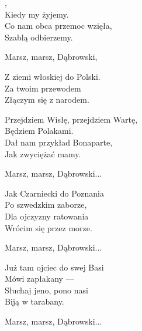 \documentclass[12pt,a4paper,twoside]{songbook}
\begin{document}
  \begin{lyrics}
    ,\\
    Kiedy my żyjemy.\\
    Co nam obca przemoc wzięła,\\
    Szablą odbierzemy.

    
    Marsz, marsz, Dąbrowski,\\
    \begin{bis}%
      Z ziemi włoskiej do Polski.\\
      Za twoim przewodem\\
      Złączym się z narodem.%
    \end{bis}
    
    Przejdziem Wisłę, przejdziem Wartę,\\
    Będziem Polakami.\\
    Dał nam przykład Bonaparte,\\
    Jak zwyciężać mamy.
      
    Marsz, marsz, Dąbrowski...

    Jak Czarniecki do Poznania\\
    Po szwedzkim zaborze,\\
    Dla ojczyzny ratowania\\
    Wrócim się przez morze.
    
    Marsz, marsz, Dąbrowski...

    Już tam ojciec do swej Basi\\
    Mówi zapłakany —\\
    Słuchaj jeno, pono nasi\\
    Biją w tarabany.

    Marsz, marsz, Dąbrowski...
  \end{lyrics}


  \begin{info}
    \lipsum
  \end{info}
\end{document}
